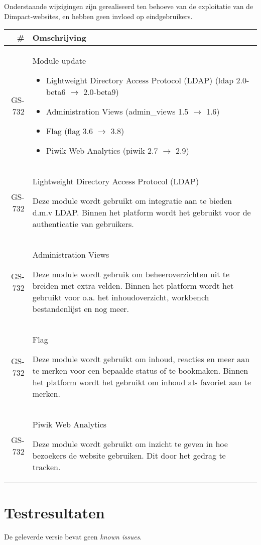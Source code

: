 \documentclass[12pt]{article}
\begin{document}
Onderstaande wijzigingen zijn gerealiseerd ten behoeve van de exploitatie van de Dimpact-websites, en hebben geen invloed op eindgebruikers.

\begin{tabular}{| r | p{15cm} |}
  \hline \# & Omschrijving \\ \hline
  GS-732 & Module update
  \begin{itemize}
    \item Lightweight Directory Access Protocol (LDAP) (ldap 2.0-beta6 $\rightarrow$ 2.0-beta9)
    \item Administration Views (admin\_views 1.5 $\rightarrow$ 1.6)
    \item Flag (flag 3.6 $\rightarrow$ 3.8)
    \item Piwik Web Analytics (piwik 2.7 $\rightarrow$ 2.9)
  \end{itemize} \\ \hline
  GS-732 & Lightweight Directory Access Protocol (LDAP)

  Deze module wordt gebruikt om integratie aan te bieden d.m.v LDAP. Binnen het platform wordt het gebruikt voor de authenticatie van gebruikers. \\ \hline
  GS-732 & Administration Views

  Deze module wordt gebruik om beheeroverzichten uit te breiden met extra velden. Binnen het platform wordt het gebruikt voor o.a. het inhoudoverzicht, workbench bestandenlijst en nog meer. \\ \hline
  GS-732 & Flag

  Deze module wordt gebruikt om inhoud, reacties en meer aan te merken voor een bepaalde status of te bookmaken. Binnen het platform wordt het gebruikt om inhoud als favoriet aan te merken. \\ \hline
  GS-732 & Piwik Web Analytics

  Deze module wordt gebruikt om inzicht te geven in hoe bezoekers de website gebruiken. Dit door het gedrag te tracken. \\ \hline
\end{tabular}

\section{Testresultaten}
De geleverde versie bevat geen \emph{known issues}.
\end{document}
